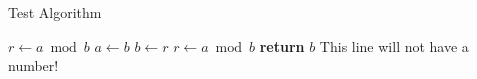 \documentclass[11pt]{article}
\makeatletter
\def\NoNumber#1{{\def\alglinenumber##1{}\State #1}\addtocounter{ALG@line}{-1}}
\makeatother
\begin{document}
\begin{algorithm}
\caption{Test Algorithm}\label{euclid}
\begin{algorithmic}[1]
  \State $r\gets a\bmod b$
      \State $a\gets b$
      \State $b\gets r$
       \State $r\gets a\bmod b$
       \EndWhile\label{euclidendwhile}
       \State \textbf{return} $b$
        \NoNumber{\color{red} This line will not have a number!}
       \EndProcedure
\end{algorithmic}
\end{algorithm}
\end{document}
